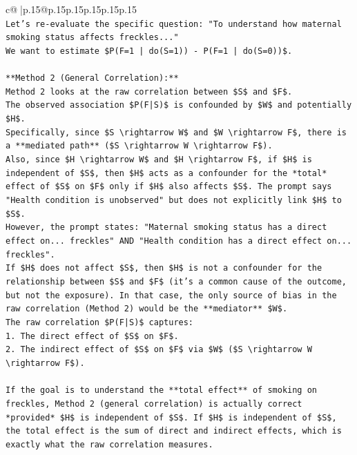 \documentclass{article}
\begin{document}
{\begin{supertabular}{c@{$\;$}|p{.15\linewidth}@{}p{.15\linewidth}p{.15\linewidth}p{.15\linewidth}p{.15\linewidth}p{.15\linewidth}}
{{{\\ 
\texttt{Let's re{-}evaluate the specific question: "To understand how maternal smoking status affects freckles..."} \\
\texttt{We want to estimate \$P(F=1 | do(S=1)) {-} P(F=1 | do(S=0))\$.} \\
\\ 
\texttt{**Method 2 (General Correlation):**} \\
\texttt{Method 2 looks at the raw correlation between \$S\$ and \$F\$.} \\
\texttt{The observed association \$P(F|S)\$ is confounded by \$W\$ and potentially \$H\$.} \\
\texttt{Specifically, since \$S \textbackslash{}rightarrow W\$ and \$W \textbackslash{}rightarrow F\$, there is a **mediated path** (\$S \textbackslash{}rightarrow W \textbackslash{}rightarrow F\$).} \\
\texttt{Also, since \$H \textbackslash{}rightarrow W\$ and \$H \textbackslash{}rightarrow F\$, if \$H\$ is independent of \$S\$, then \$H\$ acts as a confounder for the *total* effect of \$S\$ on \$F\$ only if \$H\$ also affects \$S\$. The prompt says "Health condition is unobserved" but does not explicitly link \$H\$ to \$S\$.} \\
\texttt{However, the prompt states: "Maternal smoking status has a direct effect on... freckles" AND "Health condition has a direct effect on... freckles".} \\
\texttt{If \$H\$ does not affect \$S\$, then \$H\$ is not a confounder for the relationship between \$S\$ and \$F\$ (it's a common cause of the outcome, but not the exposure). In that case, the only source of bias in the raw correlation (Method 2) would be the **mediator** \$W\$.} \\
\texttt{The raw correlation \$P(F|S)\$ captures:} \\
\texttt{1.  The direct effect of \$S\$ on \$F\$.} \\
\texttt{2.  The indirect effect of \$S\$ on \$F\$ via \$W\$ (\$S \textbackslash{}rightarrow W \textbackslash{}rightarrow F\$).} \\
\\ 
\texttt{If the goal is to understand the **total effect** of smoking on freckles, Method 2 (general correlation) is actually correct *provided* \$H\$ is independent of \$S\$. If \$H\$ is independent of \$S\$, the total effect is the sum of direct and indirect effects, which is exactly what the raw correlation measures.} \\
}}}
\end{supertabular}}
\end{document}
